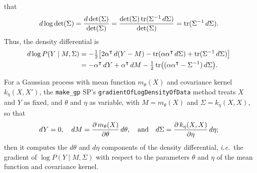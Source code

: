 \documentclass{article}
\newcommand{\Mu}{M}
\newcommand{\T}{\intercal}
\newcommand{\code}[1]{\texttt{#1}}
\newcommand{\given}{\mathrel{|}}
\newcommand{\smallfrac}[2]{{\textstyle\frac{#1}{#2}}}
\newcommand{\n}[1]{\text{\rm #1}}
\newcommand{\zero}{\n0}
\newcommand{\one}{\n1}
\newcommand{\two}{\n2}
\DeclareMathOperator{\tr}{tr}
\begin{document}
 that
%
\begin{equation}
  d \log \det(\Sigma)
    = \frac{d \det(\Sigma)}{\det(\Sigma)}
    = \frac{\det(\Sigma) \tr(\Sigma^{-\one}\,d\Sigma)}{\det(\Sigma)}
    = \tr(\Sigma^{-\one}\,d\Sigma).
\end{equation}
%
Thus, the density differential is
%
\begin{align}
  d \log P(Y \given \Mu, \Sigma)
   &= -\smallfrac{\one}{\two}
      \bigl[
        \two \alpha^\T\,d(Y - \Mu)
        - \tr(\alpha \alpha^\T\,d\Sigma)
        + \tr(\Sigma^{-\one}\,d\Sigma)
      \bigr] \\
   &= -\alpha^\T\,dY
      + \alpha^\T\,d\Mu
      - \smallfrac{\one}{\two}
        \tr\bigl((\alpha \alpha^\T - \Sigma^{-\one}) \,d\Sigma\bigr).
\end{align}

For a Gaussian process with mean function $m_\theta(X)$ and covariance
 kernel $k_\eta(X, X')$, the \code{make\_gp} SP's
 \code{gradientOfLogDensityOfData} method treats $X$ and $Y$ as fixed,
 and $\theta$ and $\eta$ as variable, with $\Mu = m_\theta(X)$ and
 $\Sigma = k_\eta(X, X)$, so that
%
\begin{equation}
  dY = \zero,
  \quad
  d\Mu = \frac{\partial\,m_\theta(X)}{\partial\theta}\,d\theta,
  \quad\text{and}\quad
  d\Sigma = \frac{\partial\,k_\eta(X, X)}{\partial\eta}\,d\eta;
\end{equation}
%
 then it computes the $d\theta$ and $d\eta$ components of the
 density differential, \textit{i.e.}~the gradient of $\log P(Y \given
 \Mu, \Sigma)$ with respect to the parameters $\theta$ and $\eta$ of
 the mean function and covariance kernel.
\end{document}
